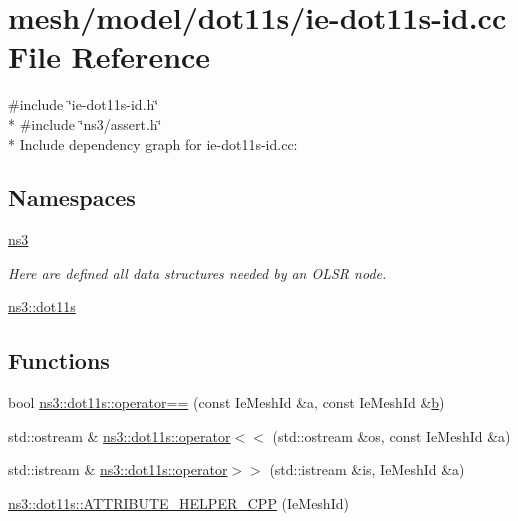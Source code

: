 \hypertarget{ie-dot11s-id_8cc}{}\section{mesh/model/dot11s/ie-\/dot11s-\/id.cc File Reference}
\label{ie-dot11s-id_8cc}
{\ttfamily \#include \char`\"{}ie-\/dot11s-\/id.\+h\char`\"{}}\\*
{\ttfamily \#include \char`\"{}ns3/assert.\+h\char`\"{}}\\*
Include dependency graph for ie-\/dot11s-\/id.cc\+:
\subsection*{Namespaces}
\begin{DoxyCompactItemize}
\item 
 \hyperlink{namespacens3}{ns3}
\begin{DoxyCompactList}\small\item\em Here are defined all data structures needed by an O\+L\+SR node. \end{DoxyCompactList}\item 
 \hyperlink{namespacens3_1_1dot11s}{ns3\+::dot11s}
\end{DoxyCompactItemize}
\subsection*{Functions}
\begin{DoxyCompactItemize}
\item 
bool \hyperlink{namespacens3_1_1dot11s_a81b070543013e185dc5a803c4f8d53b2}{ns3\+::dot11s\+::operator==} (const Ie\+Mesh\+Id \&a, const Ie\+Mesh\+Id \&\hyperlink{lte__pathloss_8m_a21ad0bd836b90d08f4cf640b4c298e7c}{b})
\item 
std\+::ostream \& \hyperlink{namespacens3_1_1dot11s_a105b67e6a433a9b868bd7886afc8b8ee}{ns3\+::dot11s\+::operator$<$$<$} (std\+::ostream \&os, const Ie\+Mesh\+Id \&a)
\item 
std\+::istream \& \hyperlink{namespacens3_1_1dot11s_a3cddae596a4a40875df7df27ed1e1f71}{ns3\+::dot11s\+::operator$>$$>$} (std\+::istream \&is, Ie\+Mesh\+Id \&a)
\item 
\hyperlink{namespacens3_1_1dot11s_aa5294864a5ca39146b5c5a4c0e0bc4ef}{ns3\+::dot11s\+::\+A\+T\+T\+R\+I\+B\+U\+T\+E\+\_\+\+H\+E\+L\+P\+E\+R\+\_\+\+C\+PP} (Ie\+Mesh\+Id)
\end{DoxyCompactItemize}
